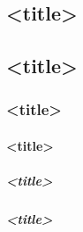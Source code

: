 \begin{macro}
\chapter*[<short-title>]{<title>}%
\section*{<title>}%
\subsection*{<title>}%
\subsubsection*{<title>}%
\paragraph*{<title>}%
\paragraph*{<title>}%
\end{macro}

\begin{noprint}
\renewcommand{\chapter}{%
	\if@article\par\@nameuse{chapterblock}\else
		\clearforchapter
		\thispagestyle{chapter}
		\global\@topnum\z@
	\fi
	\m@mindentafterchapter
	\@ifstar{\xchapter}{\@m@mchapter}}
\newcommand{\xchapter}[1][]{%
	\def\ch@pprefix{#1}%
	\@ifnextchar[{\@xchapter}{\@xchapter[]}}
\def\@xchapter[#1]#2{%
	\@schapter{\if\ch@pprefix\relax\else\ch@pprefix\afterchapternum\fi#2}
	\chaptermark{\if#1\relax#2\else#1\fi}
	\phantomsection
	\addcontentsline{toc}{chapter}{%
		\if\ch@pprefix\relax\else\ch@pprefix\cftchapteraftersnum\cftchapteraftersnumb~\fi#2}
	\addtocounter{chapter}{-1}
	\refstepcounter{chapter}}
\end{noprint}

